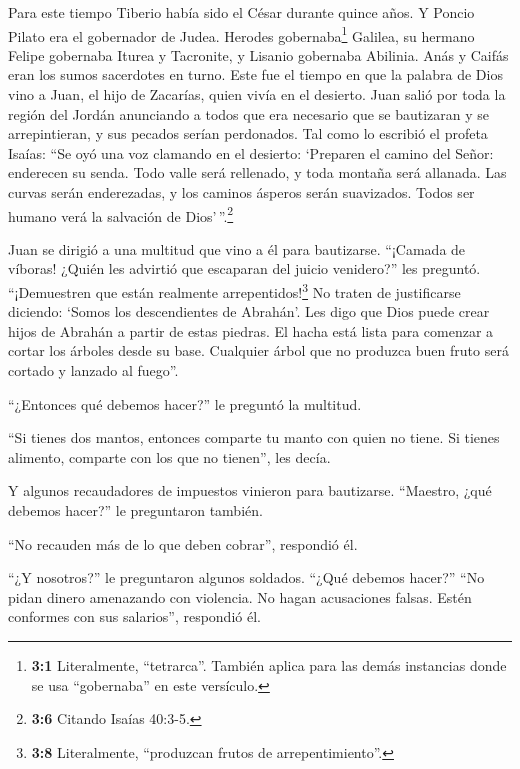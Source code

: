  Para este tiempo Tiberio había sido el César durante
quince años. Y Poncio Pilato era el gobernador de Judea. Herodes
gobernaba\footnote{\textbf{3:1} Literalmente, ``tetrarca''. También
  aplica para las demás instancias donde se usa ``gobernaba'' en este
  versículo.} Galilea, su hermano Felipe gobernaba Iturea y Tacronite, y
Lisanio gobernaba Abilinia.  Anás y Caifás eran los sumos
sacerdotes en turno. Este fue el tiempo en que la palabra de Dios vino a
Juan, el hijo de Zacarías, quien vivía en el desierto. 
Juan salió por toda la región del Jordán anunciando a todos que era
necesario que se bautizaran y se arrepintieran, y sus pecados serían
perdonados.  Tal como lo escribió el profeta Isaías: ``Se
oyó una voz clamando en el desierto: `Preparen el camino del Señor:
enderecen su senda.  Todo valle será rellenado, y toda
montaña será allanada. Las curvas serán enderezadas, y los caminos
ásperos serán suavizados.  Todos ser humano verá la
salvación de Dios'\,''.\footnote{\textbf{3:6} Citando Isaías 40:3-5.}

 Juan se dirigió a una multitud que vino a él para
bautizarse. ``¡Camada de víboras! ¿Quién les advirtió que escaparan del
juicio venidero?'' les preguntó.  ``¡Demuestren que están
realmente arrepentidos!\footnote{\textbf{3:8} Literalmente, ``produzcan
  frutos de arrepentimiento''.} No traten de justificarse diciendo:
`Somos los descendientes de Abrahán'. Les digo que Dios puede crear
hijos de Abrahán a partir de estas piedras.  El hacha está
lista para comenzar a cortar los árboles desde su base. Cualquier árbol
que no produzca buen fruto será cortado y lanzado al fuego''.

 ``¿Entonces qué debemos hacer?'' le preguntó la
multitud.

 ``Si tienes dos mantos, entonces comparte tu manto con
quien no tiene. Si tienes alimento, comparte con los que no tienen'',
les decía.

 Y algunos recaudadores de impuestos vinieron para
bautizarse. ``Maestro, ¿qué debemos hacer?'' le preguntaron también.

 ``No recauden más de lo que deben cobrar'', respondió
él.

 ``¿Y nosotros?'' le preguntaron algunos soldados. ``¿Qué
debemos hacer?'' ``No pidan dinero amenazando con violencia. No hagan
acusaciones falsas. Estén conformes con sus salarios'', respondió él.

